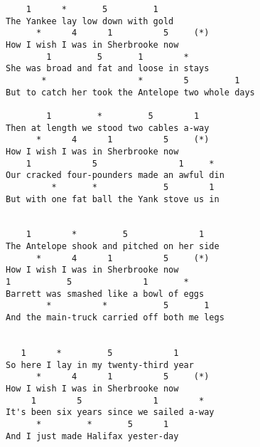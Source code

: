 \documentclass[leqno]{memoir}
\begin{document}
\begin{verbatim}
    1      *       5         1
The Yankee lay low down with gold
      *      4      1          5     (*)
How I wish I was in Sherbrooke now
        1         5       1        *
She was broad and fat and loose in stays
       *                  *        5         1
But to catch her took the Antelope two whole days

        1         *         5        1
Then at length we stood two cables a-way
      *      4      1          5     (*)
How I wish I was in Sherbrooke now
    1            5                1     *
Our cracked four-pounders made an awful din
         *       *             5        1
But with one fat ball the Yank stove us in


    1        *         5              1
The Antelope shook and pitched on her side
      *      4      1          5     (*)
How I wish I was in Sherbrooke now
1           5              1       *
Barrett was smashed like a bowl of eggs
        *          *           5       1
And the main-truck carried off both me legs


   1      *         5            1
So here I lay in my twenty-third year
      *      4      1          5     (*)
How I wish I was in Sherbrooke now
     1        5              1        *
It's been six years since we sailed a-way
      *         *       5      1
And I just made Halifax yester-day
\end{verbatim}
\newpage
\end{document}
